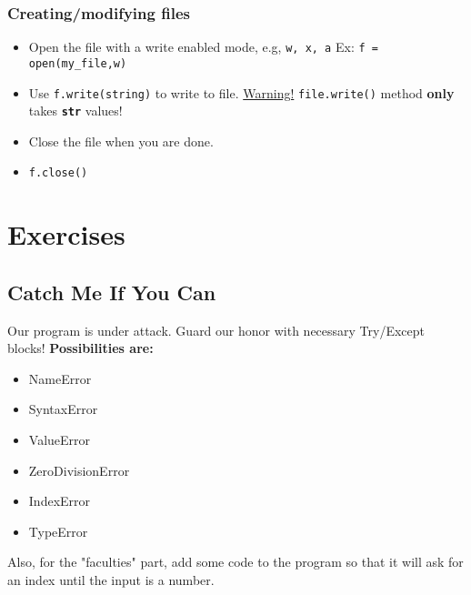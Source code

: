 \documentclass[a4paper]{article}
\begin{document}
\subsubsection{Creating/modifying files}
    \begin{itemize}
        \item Open the file with a write enabled mode, e.g, \texttt{w, x, a}
        \subitem Ex: \texttt{f = open(\textquotesingle my\_file\textquotesingle ,\textquotesingle w\textquotesingle )}
        \item Use \texttt{f.write(string)} to write to file.
        \subitem \underline{Warning!} \texttt{file.write()} method \textbf{only} takes \texttt{\textbf{str}} values!
        \item Close the file when you are done.
        \item \texttt{f.close()}
    \end{itemize}
        
\section{Exercises}
\subsection{Catch Me If You Can}
Our program is under attack. Guard our honor with necessary Try/Except blocks!
\textbf{Possibilities are: }
\begin{itemize}
    \item NameError
    \item SyntaxError
    \item ValueError
    \item ZeroDivisionError
    \item IndexError
    \item TypeError
    
\end{itemize}
Also, for the "faculties" part, add some code to the program so that it will ask for an index until the input is a number.
\end{document}
